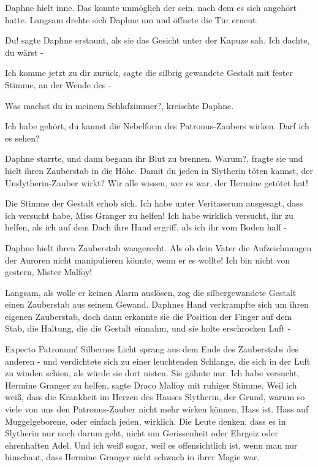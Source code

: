 Daphne hielt inne. Das konnte unmöglich der sein, nach dem es sich angehört
hatte. Langsam drehte sich Daphne um und öffnete die Tür erneut.

\glqq Du!\grqq{} sagte Daphne erstaunt, als sie das Gesicht unter der Kapuze
sah. \glqq Ich dachte, du wärst -\grqq{}

\glqq Ich komme jetzt zu dir zurück\grqq{}, sagte die silbrig gewandete Gestalt
mit fester Stimme, \glqq an der Wende des -\grqq{}

\glqq Was machst du in meinem Schlafzimmer?\grqq{}, kreischte Daphne.

\glqq Ich habe gehört, du kannst die Nebelform des Patronus-Zaubers wirken. Darf
ich es sehen?\grqq{}

Daphne starrte, und dann begann ihr Blut zu brennen. \glqq Warum?\grqq{}, fragte
sie und hielt ihren Zauberstab in die Höhe. \glqq Damit du jeden in Slytherin
töten kannst, der Unslytherin-Zauber wirkt? Wir alle wissen, wer es war, der
Hermine getötet hat!\grqq{}

Die Stimme der Gestalt erhob sich. \glqq Ich habe unter Veritaserum ausgesagt,
dass ich versucht habe, Miss Granger zu helfen! Ich habe wirklich versucht, ihr
zu helfen, als ich auf dem Dach ihre Hand ergriff, als ich ihr vom Boden half
-\grqq{}

Daphne hielt ihren Zauberstab waagerecht. \glqq Als ob dein Vater die
Aufzeichnungen der Auroren nicht manipulieren könnte, wenn er es wollte! Ich bin
nicht von gestern, Mister Malfoy!\grqq{}

Langsam, als wolle er keinen Alarm auslösen, zog die silbergewandete Gestalt
einen Zauberstab aus seinem Gewand. Daphnes Hand verkrampfte sich um ihren
eigenen Zauberstab, doch dann erkannte sie die Position der Finger auf dem Stab,
die Haltung, die die Gestalt einnahm, und sie holte erschrocken Luft -

\glqq Expecto Patronum!\grqq{} Silbernes Licht sprang aus dem Ende des
Zauberstabs des anderen - und verdichtete sich zu einer leuchtenden Schlange,
die sich in der Luft zu winden schien, als würde sie dort nisten. Sie gähnte
nur. \glqq Ich habe versucht, Hermine Granger zu helfen\grqq{}, sagte Draco
Malfoy mit ruhiger Stimme. \glqq Weil ich weiß, dass die Krankheit im Herzen des
Hauses Slytherin, der Grund, warum so viele von uns den Patronus-Zauber nicht
mehr wirken können, Hass ist. Hass auf Muggelgeborene, oder einfach jeden,
wirklich. Die Leute denken, dass es in Slytherin nur noch darum geht, nicht um
Gerissenheit oder Ehrgeiz oder ehrenhaften Adel. Und ich weiß sogar, weil es
offensichtlich ist, wenn man nur hinschaut, dass Hermine Granger nicht schwach
in ihrer Magie war.\grqq{}

